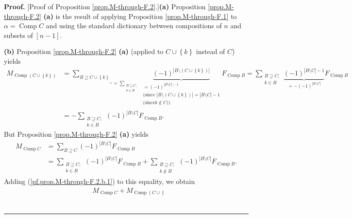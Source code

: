 \documentclass[numbers=enddot,12pt,final,onecolumn,notitlepage]{scrartcl}%
\theoremstyle{definition}
\newenvironment{proof}[1][Proof]{\noindent\textbf{#1.} }{\ \rule{0.5em}{0.5em}}
\let\sumnonlimits\sum
\renewcommand{\sum}{\sumnonlimits\limits}
\begin{document}
\begin{proof}
[Proof of Proposition \ref{prop.M-through-F.2}.]\textbf{(a)} Proposition
\ref{prop.M-through-F.2} \textbf{(a)} is the result of applying Proposition
\ref{prop.M-through-F.1} to $\alpha=\operatorname*{Comp}C$ and using the
standard dictionary between compositions of $n$ and subsets of $\left[
n-1\right]  $.

\textbf{(b)} Proposition \ref{prop.M-through-F.2} \textbf{(a)} (applied to
$C\cup\left\{  k\right\}  $ instead of $C$) yields%
\begin{align}
M_{\operatorname*{Comp}\left(  C\cup\left\{  k\right\}  \right)  }  &
=\underbrace{\sum_{B\supseteq C\cup\left\{  k\right\}  }}_{=\sum
_{\substack{B\supseteq C;\\k\in B}}}\underbrace{\left(  -1\right)
^{\left\vert B\setminus\left(  C\cup\left\{  k\right\}  \right)  \right\vert
}}_{\substack{=\left(  -1\right)  ^{\left\vert B\setminus C\right\vert
-1}\\\text{(since }\left\vert B\setminus\left(  C\cup\left\{  k\right\}
\right)  \right\vert =\left\vert B\setminus C\right\vert -1\\\text{(since
}k\notin C\text{))}}}F_{\operatorname*{Comp}B}=\sum_{\substack{B\supseteq
C;\\k\in B}}\underbrace{\left(  -1\right)  ^{\left\vert B\setminus
C\right\vert -1}}_{=-\left(  -1\right)  ^{\left\vert B\setminus C\right\vert
}}F_{\operatorname*{Comp}B}\nonumber\\
&  =-\sum_{\substack{B\supseteq C;\\k\in B}}\left(  -1\right)  ^{\left\vert
B\setminus C\right\vert }F_{\operatorname*{Comp}B}.
\label{pf.prop.M-through-F.2.b.1}%
\end{align}
But Proposition \ref{prop.M-through-F.2} \textbf{(a)} yields
\begin{align*}
M_{\operatorname*{Comp}C}  &  =\sum_{B\supseteq C}\left(  -1\right)
^{\left\vert B\setminus C\right\vert }F_{\operatorname*{Comp}B}\\
&  =\sum_{\substack{B\supseteq C;\\k\in B}}\left(  -1\right)  ^{\left\vert
B\setminus C\right\vert }F_{\operatorname*{Comp}B}+\sum_{\substack{B\supseteq
C;\\k\notin B}}\left(  -1\right)  ^{\left\vert B\setminus C\right\vert
}F_{\operatorname*{Comp}B}.
\end{align*}
Adding (\ref{pf.prop.M-through-F.2.b.1}) to this equality, we obtain%
\begin{align*}
&  M_{\operatorname*{Comp}C}+M_{\operatorname*{Comp}\left(  C\cup\left\{
}
\end{align*}
\end{proof}
\end{document}
